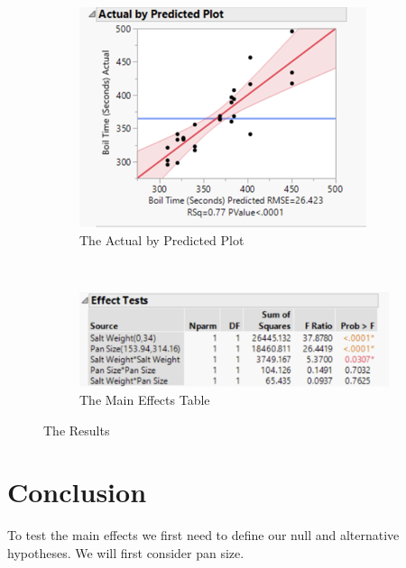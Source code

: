 \documentclass[12pt,titlepage=false]{scrartcl}
\begin{document}
\begin{figure}[t!]
    \begin{subfigure}[t]{0.45\textwidth}
        \begin{center}
            \includegraphics[width=\textwidth]{actual-by-predicted-plot.png}
        \end{center}
        \caption{The Actual by Predicted Plot}
    \end{subfigure}
    ~
    \begin{subfigure}[t]{0.45\textwidth}
        \begin{center}
            \includegraphics[width=\textwidth]{effects.png}
        \end{center}
        \caption{The Main Effects Table}
    \end{subfigure}

    \caption{The Results}
    \label{fig:results}
\end{figure}

\section{Conclusion}
\label{sec:conclusion}
To test the main effects we first need to define our null and alternative hypotheses. We will first consider pan size.
\end{document}
